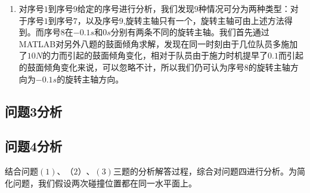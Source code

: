\documentclass{cumcm}
\begin{document}
\begin{enumerate}
\item 对序号$1$到序号$9$给定的序号进行分析，我们发现$9$种情况可分为两种类型：对于序号$1$到序号$7$，以及序号$9$,旋转主轴只有一个，旋转主轴可由上述方法得到。而序号$8$在$-0.1s$和$0s$分别有两条不同的旋转主轴。我们首先通过MATLAB对另外八题的鼓面倾角求解，发现在同一时刻由于几位队员多施加了$10N$的力而引起的鼓面倾角变化，相对于队员由于施力时机提早了$0.1$而引起的鼓面倾角变化来说，可以忽略不计，所以我们仍可认为序号$8$的旋转主轴方向为$-0.1s$的旋转主轴方向。
\end{enumerate}

\subsection{问题3分析}

\subsection{问题4分析}
结合问题$(1)$、$（2）$、$(3)$三题的分析解答过程，综合对问题四进行分析。为简化问题，我们假设两次碰撞位置都在同一水平面上。
\end{document}
